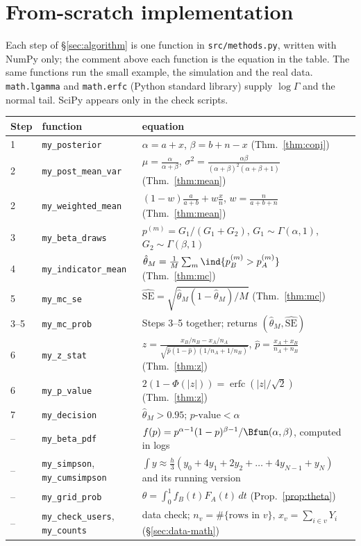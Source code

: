 \section{From-scratch implementation}\label{sec:impl}

Each step of \S\ref{sec:algorithm} is one function in \texttt{src/methods.py}, written with NumPy only; the comment
above each function is the equation in the table. The same functions run the small example, the simulation and
the real data. \texttt{math.lgamma} and \texttt{math.erfc} (Python standard library) supply $\log\Gamma$ and the
normal tail. SciPy appears only in the check scripts.

\begin{center}\small
\begin{tabular}{l l p{7.6cm}}\toprule
Step & function & equation\\ \midrule
1 & \texttt{my\_posterior} & $\alpha=a+x$, $\beta=b+n-x$ \hfill (Thm.~\ref{thm:conj})\\
2 & \texttt{my\_post\_mean\_var} & $\mu=\frac{\alpha}{\alpha+\beta}$, $\sigma^2=\frac{\alpha\beta}{(\alpha+\beta)^2(\alpha+\beta+1)}$ \hfill (Thm.~\ref{thm:mean})\\
2 & \texttt{my\_weighted\_mean} & $(1-w)\frac a{a+b}+w\frac xn$, $w=\frac n{a+b+n}$ \hfill (Thm.~\ref{thm:mean})\\
3 & \texttt{my\_beta\_draws} & $p^{(m)}=G_1/(G_1+G_2)$, $G_1\sim\Gamma(\alpha,1)$, $G_2\sim\Gamma(\beta,1)$\\
4 & \texttt{my\_indicator\_mean} & $\hat\theta_M=\frac1M\sum_m\ind{p_B^{(m)}>p_A^{(m)}}$ \hfill (Thm.~\ref{thm:mc})\\
5 & \texttt{my\_mc\_se} & $\widehat{\mathrm{SE}}=\sqrt{\hat\theta_M(1-\hat\theta_M)/M}$ \hfill (Thm.~\ref{thm:mc})\\
3--5 & \texttt{my\_mc\_prob} & Steps 3--5 together; returns $(\hat\theta_M,\widehat{\mathrm{SE}})$\\
6 & \texttt{my\_z\_stat} & $z=\frac{x_B/n_B-x_A/n_A}{\sqrt{\hat p(1-\hat p)(1/n_A+1/n_B)}}$, $\hat p=\frac{x_A+x_B}{n_A+n_B}$ \hfill (Thm.~\ref{thm:z})\\
6 & \texttt{my\_p\_value} & $2(1-\Phi(|z|))=\operatorname{erfc}(|z|/\sqrt2)$ \hfill (Thm.~\ref{thm:z})\\
7 & \texttt{my\_decision} & $\hat\theta_M>0.95$; $p\text{-value}<\alpha$\\ \midrule
-- & \texttt{my\_beta\_pdf} & $f(p)=p^{\alpha-1}(1-p)^{\beta-1}/\Bfun(\alpha,\beta)$, computed in logs\\
-- & \texttt{my\_simpson}, \texttt{my\_cumsimpson} & $\int y\approx\frac h3(y_0+4y_1+2y_2+\dots+4y_{N-1}+y_N)$ and its running version\\
-- & \texttt{my\_grid\_prob} & $\theta=\int_0^1 f_B(t)F_A(t)\,dt$ \hfill (Prop.~\ref{prop:theta})\\
-- & \texttt{my\_check\_users}, \texttt{my\_counts} & data check; $n_v=\#\{\text{rows in }v\}$, $x_v=\sum_{i\in v}Y_i$ \hfill (\S\ref{sec:data-math})\\
\bottomrule\end{tabular}\normalsize
\end{center}

